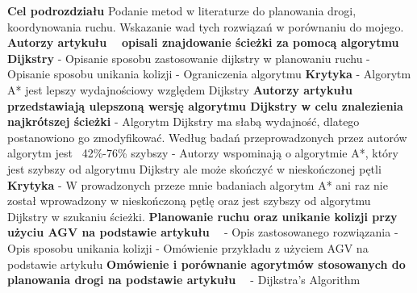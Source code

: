 \textbf{Cel podrozdziału}
\newline
Podanie metod w literaturze do planowania drogi, koordynowania ruchu. Wskazanie wad tych rozwiązań w porównaniu do mojego.
\newline
\newline
\textbf{Autorzy artykułu ~\cite{shaikh2013agv} opisali znajdowanie ścieżki za pomocą algorytmu Dijkstry}
\newline
- Opisanie sposobu zastosowanie dijkstry w planowaniu ruchu
\newline
- Opisanie sposobu unikania kolizji
\newline
- Ograniczenia algorytmu
\newline
\newline
\textbf{Krytyka}
\newline
- Algorytm A* jest lepszy wydajnościowy względem Dijkstry
\newline
\newline
\textbf{Autorzy artykułu ~\cite{huang2013improved} przedstawiają ulepszoną wersję algorytmu Dijkstry w celu znalezienia najkrótszej ścieżki}
\newline
- Algorytm Dijkstry ma słabą wydajność, dlatego postanowiono go zmodyfikować. Według badań przeprowadzonych przez autorów algorytm jest ~42\%-76\% szybszy
\newline
- Autorzy wspominają o algorytmie A*, który jest szybszy od algorytmu Dijkstry ale może skończyć w nieskończonej pętli
\newline
\newline
\textbf{Krytyka}
\newline
- W prowadzonych przeze mnie badaniach algorytm A* ani raz nie został wprowadzony w nieskończoną pętlę oraz jest szybszy od algorytmu Dijkstry w szukaniu ścieżki.
\newline
\newline
\textbf{Planowanie ruchu oraz unikanie kolizji przy użyciu AGV na podstawie artykułu ~\cite{ando2003autonomous}}
\newline
- Opis zastosowanego rozwiązania
\newline
- Opis sposobu unikania kolizji
\newline
- Omówienie przykładu z użyciem AGV na podstawie artykułu
\newline
\newline
\textbf{Omówienie i porównanie agorytmów stosowanych do planowania drogi na podstawie artykułu ~\cite{delling2009engineering}}
  \newline
  - Dijkstra's Algorithm
